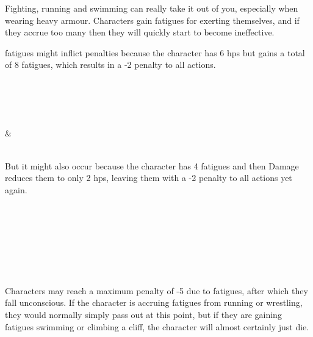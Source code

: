 \begin{multicols}{2}

\label{fatigue}

\noindent
Fighting, running and swimming can really take it out of you, especially when wearing heavy armour.
Characters gain \glspl{fatigue} for exerting themselves, and if they accrue too many then they will quickly start to become ineffective.



\noindent
\Glspl{fatigue} might inflict penalties because the character has 6 \glspl{hp} but gains a total of 8 \glspl{fatigue}, which results in a -2 penalty to all actions.

\begin{boxtable}[lllllllllX]

   \\
    \statCircle
  \\
   \Square
  \\
   \\
   \Square & \Square \\
   \\

\end{boxtable}

But it might also occur because the character has 4 \glspl{fatigue} and then Damage reduces them to only 2 \glspl{hp}, leaving them with a -2 penalty to all actions yet again.

\begin{boxtable}[lllllllllX]

   \\
    \statCircle
  \\
     \Square
  \\
   \\
    \Square \\
   \\

\end{boxtable}

Characters may reach a maximum penalty of -5 due to \glspl{fatigue}, after which they fall unconscious.
If the character is accruing \glspl{fatigue} from running or wrestling, they would normally simply pass out at this point, but if they are gaining \glspl{fatigue} swimming or climbing a cliff, the character will almost certainly just die.


\end{multicols}
